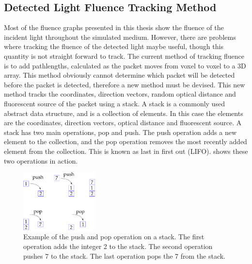 \begin{appendices}
\chapter{Detected Light Fluence Tracking Method}
\label{app:lightdect}

Most of the fluence graphs presented in this thesis show the fluence of the incident light throughout the simulated medium.
However, there are problems where tracking the fluence of the detected light maybe useful, though this quantity is not straight forward to track.
The current method of tracking fluence is to add pathlengths, calculated as the packet moves from voxel to voxel to a 3D array. 
This method obviously cannot determine which packet will be detected before the packet is detected, therefore a new method must be devised.
This new method tracks the coordinates, direction vectors, random optical distance and fluorescent source of the packet using a stack.
A stack is a commonly used abstract data structure, and is a collection of elements.
In this case the elements are the coordinates, direction vectors, optical distance and fluorescent source.
A stack has two main operations, pop and push.
The push operation adds a new element to the collection, and the pop operation removes the most recently added element from the collection.
This is known as last in first out (LIFO).
 shows these two operations in action.

\begin{figure}[!htpb]
	\centering
	\includegraphics[width=0.35\textwidth]{stack.pdf}
	\caption{Example of the push and pop operation on a stack. The first operation adds the integer 2 to the stack. The second operation pushes 7 to the stack. The last operation pops the 7 from the stack.}
	\label{fig:stack}
\end{figure}


\end{appendices}
